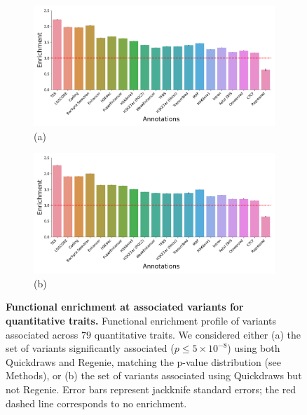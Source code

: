 \begin{figure}[h!]
    \centering
    \begin{subfigure}{0.5\textwidth}
    \captionsetup{justification=raggedright,singlelinecheck=false}
    \caption*{\large{(a)}}
    \includegraphics[width=\textwidth]{figures/functional/annotation_both_quant.pdf}
    \end{subfigure}%
    \begin{subfigure}{0.5\textwidth}
    \captionsetup{justification=raggedright,singlelinecheck=false}
    \caption*{\large{(b)}}
    \includegraphics[width=\textwidth]{figures/functional/annotation_onlyqd_quant.pdf}
    \end{subfigure}
    \caption{\textbf{Functional enrichment at associated variants for quantitative traits.}
    Functional enrichment profile of variants associated across $79$ quantitative traits.
    We considered either (a) the set of variants significantly associated ($p \leq 5 \times 10^{-8}$) using both Quickdraws and Regenie, matching the p-value distribution (see Methods), or (b) the set of variants associated using Quickdraws but not Regenie.
    Error bars represent jackknife standard errors; the red dashed line corresponds to no enrichment.
    }
    \label{fig:functional_qt}
\end{figure}


